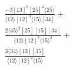 \documentclass[varwidth, border=5pt]{standalone}
\begin{document}
\begin{my}
$\begin{gathered}
\scriptscriptstyle\frac{-3[13]^2[25]^2⟨25⟩}{⟨12⟩[12]^3⟨15⟩[34]}+\\
\scriptscriptstyle\frac{2⟨45⟩^2[25][15][34]}{⟨12⟩[12]^3⟨15⟩^2}+\\
\scriptscriptstyle\frac{3⟨34⟩[13][35]}{⟨12⟩[12]^2⟨15⟩}\phantom{+}
\end{gathered}$
\end{my}
\end{document}
